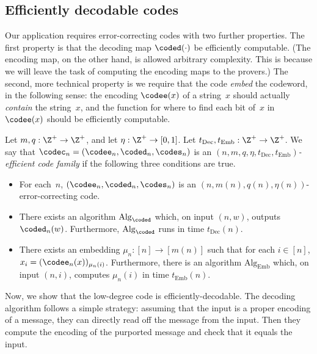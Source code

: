 \subsection{Efficiently decodable codes}

Our application requires error-correcting codes with two further properties.
The first property is that the decoding map $\coded(\cdot)$ be efficiently computable.
(The encoding map, on the other hand, is allowed arbitrary complexity.
This is because we will leave the task of computing the encoding maps to the provers.) 
The second, more technical property is
we require that the code \emph{embed} the codeword, in the following sense:
the encoding $\codee(x)$ of a string~$x$ should actually \emph{contain} the string~$x$,
and the function for where to find each bit of~$x$ in $\codee(x)$ should be efficiently computable.

\begin{definition}\label{def:efficient-codes}
Let $m, q:\Z^+\rightarrow \Z^+$,
and let $\eta:\Z^+\rightarrow [0, 1]$.
Let $t_{\mathrm{Dec}}, t_{\mathrm{Emb}}:\Z^+ \rightarrow \Z^+$.
We say that $\codec_n=(\codee_n, \coded_n, \codes_n)$ is an \emph{$(n, m, q, \eta, t_{\mathrm{Dec}}, t_{\mathrm{Emb}})$-efficient code family}
if the following three conditions are true.
\begin{itemize}
\item[$\circ$] For each~$n$, $(\codee_n, \coded_n, \codes_n)$ is an $(n, m(n), q(n), \eta(n))$-error-correcting code.
\item[$\circ$] There exists an algorithm $\mathrm{Alg}_{\coded}$ which, on input $(n, w)$, outputs $\coded_n(w)$.
			Furthermore, $\mathrm{Alg}_{\coded}$ runs in time $t_{\mathrm{Dec}}(n)$.
\item[$\circ$] There exists an embedding $\mu_n:[n] \rightarrow [m(n)]$ such that for each $i \in [n]$, $x_i = (\codee_n(x))_{\mu_n(i)}$.
			Furthermore, there is an algorithm $\mathrm{Alg}_{\mathrm{Emb}}$ which, on input $(n, i)$, computes $\mu_n(i)$ in time
			 $t_{\mathrm{Emb}}(n)$.
\end{itemize}
\end{definition}

Now, we show that the low-degree code is efficiently-decodable.
The decoding algorithm follows a simple strategy:
assuming that the input is a proper encoding of a message,
they can directly read off the message from the input.
Then they compute the encoding of the purported message and check that it equals the input.

